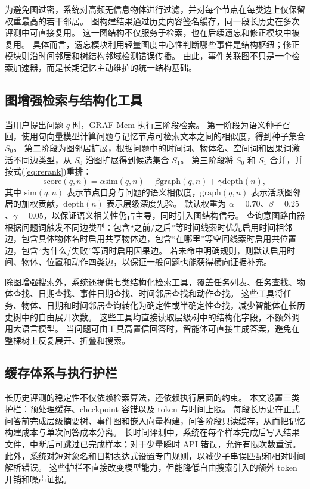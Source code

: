 \documentclass{cjc}
\begin{document}
为避免图过密，系统对高频无信息物体进行过滤，并对每个节点在每类边上仅保留权重最高的若干邻居。
图构建结果通过历史内容签名缓存，同一段长历史在多次评测中可直接复用。
这一图结构不仅服务于检索，也在后续遗忘和修正模块中被复用。
具体而言，遗忘模块利用轻量图度中心性判断哪些事件是结构枢纽；修正模块则沿时间邻居和树结构邻域检测错误传播。
由此，事件关联图不只是一个检索加速器，而是长期记忆主动维护的统一结构基础。

\subsection{图增强检索与结构化工具}

当用户提出问题 $q$ 时，GRAF-Mem 执行三阶段检索。
第一阶段为语义种子召回，使用句向量模型计算问题与记忆节点可检索文本之间的相似度，得到种子集合 $S_0$。
第二阶段为图邻居扩展，根据问题中的时间词、物体名、空间词和因果词激活不同边类型，从 $S_0$ 沿图扩展得到候选集合 $S_1$。
第三阶段将 $S_0$ 和 $S_1$ 合并，并按式(\ref{eq:rerank})重排：
\begin{equation}
\mathrm{score}(q,n)=
\alpha \mathrm{sim}(q,n)+
\beta \mathrm{graph}(q,n)+
\gamma \mathrm{depth}(n),
\label{eq:rerank}
\end{equation}
其中 $\mathrm{sim}(q,n)$ 表示节点自身与问题的语义相似度，$\mathrm{graph}(q,n)$ 表示活跃图邻居的加权贡献，$\mathrm{depth}(n)$ 表示层级深度先验。
默认权重为 $\alpha=0.70$、$\beta=0.25$、$\gamma=0.05$，以保证语义相关性仍占主导，同时引入图结构信号。
查询意图路由器根据问题词触发不同边类型：包含“之前/之后”等时间线索时优先启用时间相邻边，包含具体物体名时启用共享物体边，包含“在哪里”等空间线索时启用共位置边，包含“为什么/失败”等词时启用因果边。
若未命中明确规则，则默认启用时间、物体、位置和动作四类边，以保证一般问题也能获得横向证据补充。

除图增强搜索外，系统还提供七类结构化检索工具，覆盖任务列表、任务查找、物体查找、日期查找、事件日期查找、时间邻居查找和动作查找。
这些工具将任务、物体、日期和时间邻居查询转化为确定性或半确定性查找，减少智能体在长历史树中的自由展开次数。
这些工具均直接读取层级树中的结构化字段，不额外调用大语言模型。
当问题可由工具高置信回答时，智能体可直接生成答案，避免在整棵树上反复展开、折叠和搜索。

\subsection{缓存体系与执行护栏}

长历史评测的稳定性不仅依赖检索算法，还依赖执行层面的约束。
本文设置三类护栏：预处理缓存、checkpoint 容错以及 token 与时间上限。
每段长历史在正式问答前完成层级摘要树、事件图和嵌入向量构建，问答阶段只读缓存，从而把记忆构建成本与单次问答成本分离。
长时间评测中，系统在每个样本完成后写入结果文件，中断后可跳过已完成样本；对于少量瞬时 API 错误，允许有限次数重试。
此外，系统对短对象名和日期表达式设置专门规则，以减少子串误匹配和相对时间解析错误。
这些护栏不直接改变模型能力，但能降低自由搜索引入的额外 token 开销和噪声证据。
\end{document}
